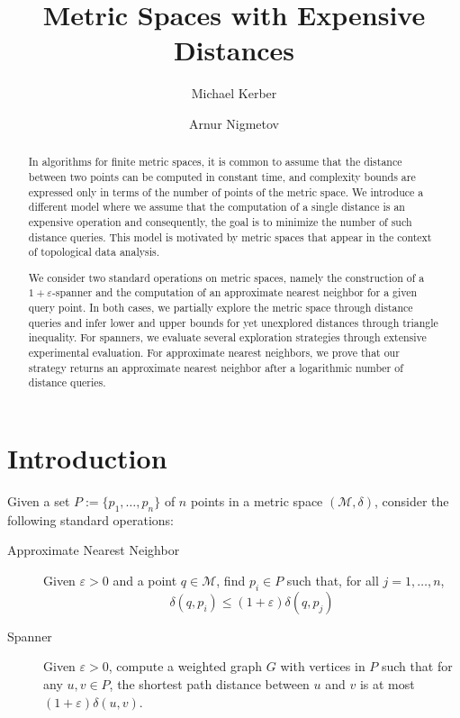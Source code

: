 \documentclass[a4paper,UKenglish,cleveref, autoref]{lipics-v2019}
\title{Metric Spaces with Expensive Distances}
\author{Michael Kerber}{TU Graz}{kerber@tugraz.at}{https://orcid.org/0000-0002-8030-9299}{Supported by Austrian Science Fund (FWF) grant number P 29984-N35}
\author{Arnur Nigmetov}{TU Graz}{nigmetov@tugraz.at}{}{}
\newcommand{\eps}{\varepsilon}
\newcommand{\metricspace}{\mathcal{M}}
\newcommand{\pointset}{P}
\newcommand{\dist}{\delta}
\begin{document}
\maketitle

\begin{abstract}
In algorithms for finite metric spaces, it is common
to assume that the distance between two points
can be computed in constant time, and complexity
bounds are expressed only in terms of the number
of points of the metric space.
We introduce a different model where we assume
that the computation of a single distance is
an expensive operation and consequently, the goal is
to minimize the number of such distance queries.
This model is motivated by metric spaces
that appear in the context of topological data analysis.

We consider two standard operations on metric spaces,
namely the construction of a $1+\eps$-spanner
and the computation of an approximate nearest
neighbor for a given query point.
In both cases, we partially explore the metric space
through distance queries and infer lower and upper bounds
for yet unexplored distances through triangle inequality.
For spanners, we evaluate several exploration strategies
through extensive experimental evaluation.
For approximate nearest neighbors, we prove that our
strategy returns an approximate nearest neighbor
after a logarithmic number of distance queries.
\end{abstract}




\section{Introduction}

Given a set $\pointset:=\{p_1,\ldots,p_n\}$ of $n$ points
in a metric space $(\metricspace,\dist)$, 
consider the following standard operations:

\begin{description}
\item[Approximate Nearest Neighbor] Given $\eps>0$ and a point $q\in\metricspace$,
find $p_i\in\pointset$ such that, for all $j=1,\ldots,n$,
\[\dist(q,p_i)\leq(1+\eps)\dist(q,p_j)\]

\item[Spanner] Given $\eps>0$, compute a weighted graph $G$ with vertices in $\pointset$
such that for any $u,v\in\pointset$, the shortest path distance between $u$ and $v$
is at most $(1+\eps)\dist(u,v)$.
\end{description}
\end{document}
